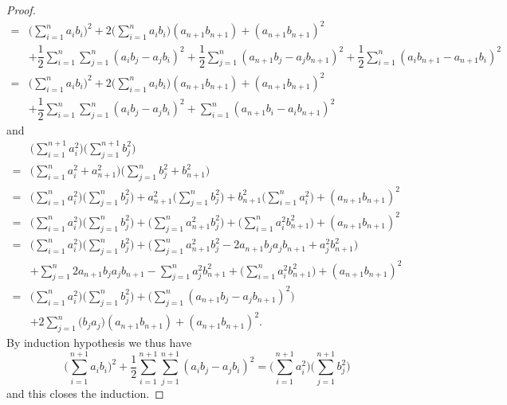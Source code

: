 \begin{proof}
\begin{align*}
    = & \bigg(\sum_{i = 1}^n a_i b_i\bigg)^2 + 2 \bigg(\sum_{i = 1}^n a_i b_i\bigg) (a_{n + 1} b_{n + 1}) + (a_{n + 1} b_{n + 1})^2                                                                                \\
      & + \dfrac{1}{2} \sum_{i = 1}^n \sum_{j = 1}^n (a_i b_j - a_j b_i)^2 + \dfrac{1}{2} \sum_{j = 1}^n (a_{n + 1} b_j - a_j b_{n + 1})^2 + \dfrac{1}{2} \sum_{i = 1}^n (a_i b_{n + 1} - a_{n + 1} b_i)^2         \\
    = & \bigg(\sum_{i = 1}^n a_i b_i\bigg)^2 + 2 \bigg(\sum_{i = 1}^n a_i b_i\bigg) (a_{n + 1} b_{n + 1}) + (a_{n + 1} b_{n + 1})^2                                                                                \\
      & + \dfrac{1}{2} \sum_{i = 1}^n \sum_{j = 1}^n (a_i b_j - a_j b_i)^2 + \sum_{i = 1}^n (a_{n + 1} b_i - a_i b_{n + 1})^2
  \end{align*}
  and
  \begin{align*}
      & \bigg(\sum_{i = 1}^{n + 1} a_i^2\bigg) \bigg(\sum_{j = 1}^{n + 1} b_j^2\bigg)                                                                                                             \\
    = & \bigg(\sum_{i = 1}^n a_i^2 + a_{n + 1}^2\bigg) \bigg(\sum_{j = 1}^n b_j^2 + b_{n + 1}^2\bigg)                                                                                             \\
    = & \bigg(\sum_{i = 1}^n a_i^2\bigg) \bigg(\sum_{j = 1}^n b_j^2\bigg) + a_{n + 1}^2 \bigg(\sum_{j = 1}^n b_j^2\bigg) + b_{n + 1}^2 \bigg(\sum_{i = 1}^n a_i^2\bigg) + (a_{n + 1} b_{n + 1})^2 \\
    = & \bigg(\sum_{i = 1}^n a_i^2\bigg) \bigg(\sum_{j = 1}^n b_j^2\bigg) + \bigg(\sum_{j = 1}^n a_{n + 1}^2 b_j^2\bigg) + \bigg(\sum_{i = 1}^n a_i^2 b_{n + 1}^2\bigg) + (a_{n + 1} b_{n + 1})^2 \\
    = & \bigg(\sum_{i = 1}^n a_i^2\bigg) \bigg(\sum_{j = 1}^n b_j^2\bigg) + \bigg(\sum_{j = 1}^n a_{n + 1}^2 b_j^2 - 2 a_{n + 1} b_j a_j b_{n + 1} + a_j^2 b_{n + 1}^2\bigg)                      \\
      & + \sum_{j = 1}^n 2 a_{n + 1} b_j a_j b_{n + 1} - \sum_{j = 1}^n a_j^2 b_{n + 1}^2 + \bigg(\sum_{i = 1}^n a_i^2 b_{n + 1}^2\bigg) + (a_{n + 1} b_{n + 1})^2                                \\
    = & \bigg(\sum_{i = 1}^n a_i^2\bigg) \bigg(\sum_{j = 1}^n b_j^2\bigg) + \bigg(\sum_{j = 1}^n (a_{n + 1} b_j - a_j b_{n + 1})^2\bigg)                                                          \\
      & + 2 \sum_{j = 1}^n \bigg(b_j a_j\bigg)(a_{n + 1} b_{n + 1}) + (a_{n + 1} b_{n + 1})^2.
  \end{align*}
  By induction hypothesis we thus have
  \[
    \bigg(\sum_{i = 1}^{n + 1} a_i b_i\bigg)^2 + \dfrac{1}{2} \sum_{i = 1}^{n + 1} \sum_{j = 1}^{n + 1} (a_i b_j - a_j b_i)^2 = \bigg(\sum_{i = 1}^{n + 1} a_i^2\bigg) \bigg(\sum_{j = 1}^{n + 1} b_j^2\bigg)
  \]
  and this closes the induction.


\end{proof}
